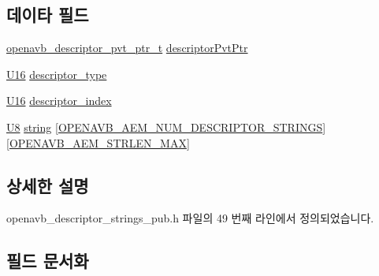 \subsection*{데이타 필드}
\begin{DoxyCompactItemize}
\item 
\hyperlink{openavb__aem__pub_8h_a85eabab4b7d2466e94c1c3b43b11371d}{openavb\+\_\+descriptor\+\_\+pvt\+\_\+ptr\+\_\+t} \hyperlink{structopenavb__aem__descriptor__strings__t_a302e92fd6cf4d398d5305395359fb157}{descriptor\+Pvt\+Ptr}
\item 
\hyperlink{openavb__types__base__pub_8h_a0a0a322d5fa4a546d293a77ba8b4a71f}{U16} \hyperlink{structopenavb__aem__descriptor__strings__t_a1e231d7874aada5925b29affc76782cc}{descriptor\+\_\+type}
\item 
\hyperlink{openavb__types__base__pub_8h_a0a0a322d5fa4a546d293a77ba8b4a71f}{U16} \hyperlink{structopenavb__aem__descriptor__strings__t_ab26fb363c24b9a2a4391f9171c981b08}{descriptor\+\_\+index}
\item 
\hyperlink{openavb__types__base__pub_8h_aa63ef7b996d5487ce35a5a66601f3e73}{U8} \hyperlink{structopenavb__aem__descriptor__strings__t_a4d5751a6bc93c78ad863055af5f05e7c}{string} \mbox{[}\hyperlink{openavb__descriptor__strings__pub_8h_ae41e3139204c5d9afb3bfc354ca967c5}{O\+P\+E\+N\+A\+V\+B\+\_\+\+A\+E\+M\+\_\+\+N\+U\+M\+\_\+\+D\+E\+S\+C\+R\+I\+P\+T\+O\+R\+\_\+\+S\+T\+R\+I\+N\+GS}\mbox{]}\mbox{[}\hyperlink{openavb__aem__types__pub_8h_ab2bb82e9f856a76b8305e4864f23ee58}{O\+P\+E\+N\+A\+V\+B\+\_\+\+A\+E\+M\+\_\+\+S\+T\+R\+L\+E\+N\+\_\+\+M\+AX}\mbox{]}
\end{DoxyCompactItemize}


\subsection{상세한 설명}


openavb\+\_\+descriptor\+\_\+strings\+\_\+pub.\+h 파일의 49 번째 라인에서 정의되었습니다.



\subsection{필드 문서화}
